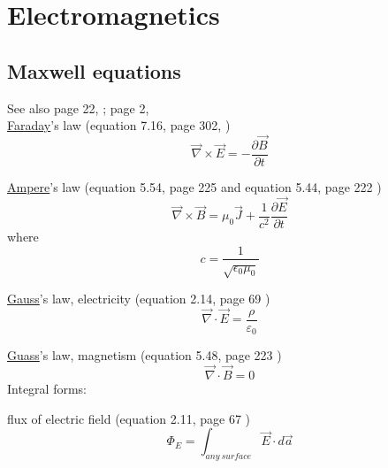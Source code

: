 \documentclass[12pt]{article}  %
\newcommand{\pfrac}[2]{\frac{\partial #1}{\partial #2}}
\begin{document}
\section{Electromagnetics} %

\subsection{Maxwell equations} %
See also page 22, \cite{ReifThermo}; page 2, \cite{JacksonED} \\ 
\underline{Faraday}'s law (equation 7.16, page 302, \cite{GriffithED})
\begin{equation}
  \vec{\nabla}\times \vec{E} = -\pfrac{\vec{B}}{t} 
  \label{eq:maxwellEcurl}
\end{equation}

\underline{Ampere}'s law (equation 5.54, page 225 and equation 5.44, page 222 \cite{GriffithED})
\begin{equation}
  \vec{\nabla}\times \vec{B} =  \mu_0\vec{J}+\frac{1}{c^2}\pfrac{\vec{E}}{t} 
  \label{eq:maxwellBcurl}
\end{equation}
where
\begin{equation}
 c = \frac{1}{\sqrt{\epsilon_0 \mu_0}}
\end{equation}

\underline{Gauss}'s law, electricity (equation 2.14, page 69 \cite{GriffithED})
\begin{equation}
  \vec{\nabla}\cdot\vec{E} = \frac{\rho}{\varepsilon_0} 
  \label{eq:maxwellEdiv} 
\end{equation}

\underline{Guass}'s law, magnetism (equation 5.48, page 223 \cite{GriffithED})
\begin{equation}
  \vec{\nabla}\cdot\vec{B} = 0  
  \label{eq:maxwellBdiv}
\end{equation}
Integral forms:

flux of electric field (equation 2.11, page 67 \cite{GriffithED})
\begin{equation}
\Phi_E = \int_{any\ surface} \vec{E} \cdot d\vec{a}
\end{equation}
\end{document}
